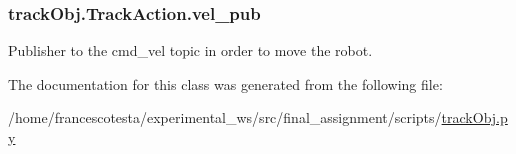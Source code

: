 \subsubsection[{\texorpdfstring{vel\+\_\+pub}{vel_pub}}]{\setlength{\rightskip}{0pt plus 5cm}track\+Obj.\+Track\+Action.\+vel\+\_\+pub\hspace{0.3cm}{\ttfamily [static]}}\hypertarget{classtrackObj_1_1TrackAction_ab9175815577a975030b162b3f450995a}{}\label{classtrackObj_1_1TrackAction_ab9175815577a975030b162b3f450995a}


Publisher to the cmd\+\_\+vel topic in order to move the robot. 



The documentation for this class was generated from the following file\+:\begin{DoxyCompactItemize}
\item 
/home/francescotesta/experimental\+\_\+ws/src/final\+\_\+assignment/scripts/\hyperlink{trackObj_8py}{track\+Obj.\+py}\end{DoxyCompactItemize}

